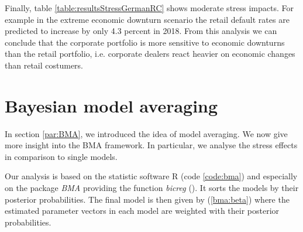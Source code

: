 \documentclass[a4paper, 12pt]{scrreprt}
\begin{document}
Finally, table \ref{table:resultsStressGermanRC} shows moderate stress impacts. For example in the extreme economic downturn scenario the retail default rates are predicted to increase by only 4.3 percent in 2018.
From this analysis we can conclude that the corporate portfolio is more sensitive to economic downturns than the retail portfolio, i.e. corporate dealers react heavier on economic changes than retail costumers. 


\section{Bayesian model averaging}\label{result:bma}

In section \ref{par:BMA}, we introduced the idea of model averaging. We now give more insight into the BMA framework. In particular, we analyse the stress effects in comparison to single models.

Our analysis is based on the statistic software R (code \ref{code:bma}) and especially on the package \textit{BMA} providing the function \textit{bicreg} (\textcite{raftery2017bma}). 
It sorts the models by their posterior probabilities. The final model is then given by (\ref{bma:beta}) where the estimated parameter vectors in each model are weighted with their posterior probabilities.
\end{document}
